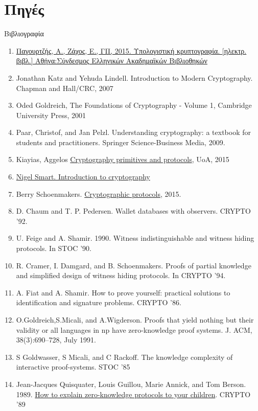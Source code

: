 \documentclass[10pt,handout]{beamer}
\begin{document}
\section{Πηγές}
\begin{frame}[allowframebreaks]{Βιβλιογραφία}
\begin{tiny}
\begin{enumerate}
\item \href{http://hdl.handle.net/11419/5439}{Παγουρτζής, Α., Ζάχος, Ε., ΓΠ, 2015. Υπολογιστική κρυπτογραφία. [ηλεκτρ. βιβλ.] Αθήνα:Σύνδεσμος Ελληνικών Ακαδημαϊκών Βιβλιοθηκών}
\item Jonathan Katz and Yehuda Lindell. Introduction to Modern Cryptography. Chapman and Hall/CRC, 2007
\item Oded Goldreich, The Foundations of Cryptography - Volume 1,  Cambridge University Press, 2001
\item Paar, Christof, and Jan Pelzl. Understanding cryptography: a textbook for students and practitioners. Springer Science-Business Media, 2009.
\item Kiayias, Aggelos  \href{http://crypto.di.uoa.gr/class/Kryptographia/Semeioseis_files/Cryptograph_Primitives_and_Protocols.pdf}{Cryptography primitives and protocols}, UoA, 2015
\item \href{http://goo.gl/b75I29}{Nigel Smart. Introduction to cryptography}
\item Berry Schoenmakers. \href{http://www.win.tue.nl/~berry/2WC13/}{Cryptographic protocols}, 2015. 
\item  D. Chaum and T. P. Pedersen. Wallet databases with observers.  CRYPTO ’92.
\item U. Feige and A. Shamir. 1990. Witness indistinguishable and witness hiding protocols. In STOC '90.
\item R. Cramer, I. Damgard, and B. Schoenmakers. Proofs of partial knowledge and simplified design of witness hiding protocols. In CRYPTO ’94.
\item A. Fiat and A. Shamir. How to prove yourself: practical solutions to identification and signature problems. CRYPTO ’86.
\item O.Goldreich,S.Micali, and A.Wigderson. Proofs that yield nothing but their validity or all languages in np have zero-knowledge proof systems. J. ACM, 38(3):690–728, July 1991.
\item S Goldwasser, S Micali, and C Rackoff. The knowledge complexity of interactive proof-systems. STOC ’85
\item  Jean-Jacques Quisquater, Louis Guillou, Marie Annick, and Tom Berson. 1989. \href{http://pages.cs.wisc.edu/~mkowalcz/628.pdf}{How to explain zero-knowledge protocols to your children}. CRYPTO '89

\end{enumerate}
\end{tiny}
\end{frame}
\end{document}
